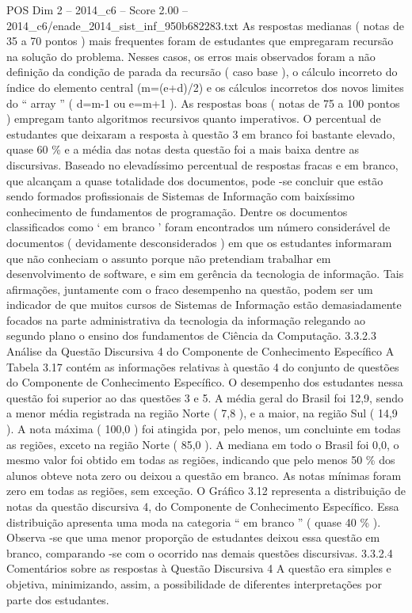 \begin{textsample}{POS Dim 2 – 2014\_c6 – Score 2.00 – 2014\_c6/enade\_2014\_sist\_inf\_950b682283.txt}
As respostas medianas ( notas de 35 a 70 pontos ) mais frequentes foram de estudantes que empregaram recursão na solução do problema.
Nesses casos, os erros mais observados foram a não definição da condição de parada da recursão ( caso base ), o cálculo incorreto do índice do elemento central (m=(e+d)/2) e os cálculos incorretos dos novos limites do “ array ” ( d=m-1 ou e=m+1 ).
As respostas boas ( notas de 75 a 100 pontos ) empregam tanto algoritmos recursivos quanto imperativos.
O percentual de estudantes que deixaram a resposta à questão 3 em branco foi bastante elevado, quase 60 \% e a média das notas desta questão foi a mais baixa dentre as discursivas.
Baseado no elevadíssimo percentual de respostas fracas e em branco, que alcançam a quase totalidade dos documentos, pode -se concluir que estão sendo formados profissionais de Sistemas de Informação com baixíssimo conhecimento de fundamentos de programação.
Dentre os documentos classificados como ‘ em branco ’ foram encontrados um número considerável de documentos ( devidamente desconsiderados ) em que os estudantes informaram que não conheciam o assunto porque não pretendiam trabalhar em desenvolvimento de software, e sim em gerência da tecnologia de informação.
Tais afirmações, juntamente com o fraco desempenho na questão, podem ser um indicador de que muitos cursos de Sistemas de Informação estão demasiadamente focados na parte administrativa da tecnologia da informação relegando ao segundo plano o ensino dos fundamentos de Ciência da Computação. 3.3.2.3 Análise da Questão Discursiva 4 do Componente de Conhecimento Específico A Tabela 3.17 contém as informações relativas à questão 4 do conjunto de questões do Componente de Conhecimento Específico.
O desempenho dos estudantes nessa questão foi superior ao das questões 3 e 5.
A média geral do Brasil foi 12,9, sendo a menor média registrada na região Norte ( 7,8 ), e a maior, na região Sul ( 14,9 ).
A nota máxima ( 100,0 ) foi atingida por, pelo menos, um concluinte em todas as regiões, exceto na região Norte ( 85,0 ).
A mediana em todo o Brasil foi 0,0, o mesmo valor foi obtido em todas as regiões, indicando que pelo menos 50 \% dos alunos obteve nota zero ou deixou a questão em branco.
As notas mínimas foram zero em todas as regiões, sem exceção.
O Gráfico 3.12 representa a distribuição de notas da questão discursiva 4, do Componente de Conhecimento Específico.
Essa distribuição apresenta uma moda na categoria “ em branco ” ( quase 40 \% ).
Observa -se que uma menor proporção de estudantes deixou essa questão em branco, comparando -se com o ocorrido nas demais questões discursivas. 3.3.2.4 Comentários sobre as respostas à Questão Discursiva 4 A questão era simples e objetiva, minimizando, assim, a possibilidade de diferentes interpretações por parte dos estudantes.

\end{textsample}
